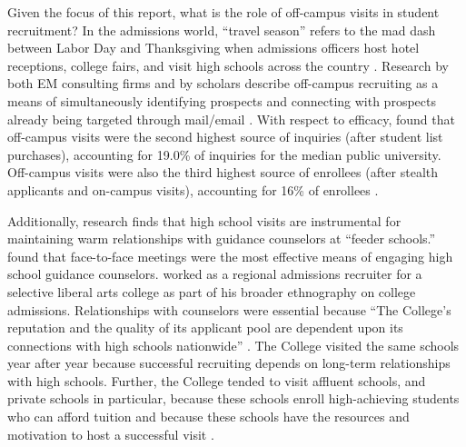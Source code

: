 \documentclass[twoside]{article}
\begin{document}
Given the focus of this report, what is the role of off-campus visits in student recruitment? In the admissions world, ``travel season'' refers to the mad dash between Labor Day and Thanksgiving when admissions officers host hotel receptions, college fairs, and visit high schools across the country \citep{RN3519}. Research by both EM consulting firms and by scholars describe off-campus recruiting as a means of simultaneously identifying prospects and connecting with prospects already being targeted through mail/email \citep[e.g., ][]{RN4323,RN4315,RN3519}. With respect to efficacy, \cite{RN4402} found that off-campus visits were the second highest source of inquiries (after student list purchases), accounting for 19.0\% of inquiries for the median public university. Off-campus visits were also the third highest source of enrollees (after stealth applicants and on-campus visits), accounting for 16\% of enrollees \citep{RN4402}.

Additionally, research finds that high school visits are instrumental for maintaining warm relationships with guidance counselors at ``feeder schools.'' \cite{RN4402} found that face-to-face meetings were the most effective means of engaging high school guidance counselors.  \cite{RN3519} worked as a regional admissions recruiter for a selective liberal arts college as part of his broader ethnography on college admissions.  Relationships with counselors were essential because ``The College's reputation and the quality of its applicant pool are dependent upon its connections with high schools nationwide'' \citep[p.~53]{RN3519}. The College visited the same schools year after year because successful recruiting depends on long-term relationships with high schools. Further, the College tended to visit affluent schools, and private schools in particular, because these schools enroll high-achieving students who can afford tuition and because these schools have the resources and motivation to host a successful visit \citep{RN3519}.

\end{document}
